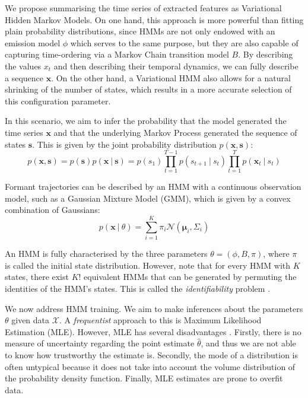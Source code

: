\documentclass[pdftex,11pt,a4paper]{article}
\theoremstyle{definition}
\theoremstyle{remark}
\newcommand*{\V}[1]{\mathbf{#1}}%
\newcommand\given[1][]{\:#1\vert\:}
\begin{document}
We propose summarising the time series of extracted features as Variational Hidden Markov Models. On one hand, this approach is more powerful than fitting plain probability distributions, since HMMs are not only endowed with an emission model $\phi$ which serves to the same purpose, but they are also capable of capturing time-ordering via a Markov Chain transition model $B$. By describing the values $x_t$ and then describing their temporal dynamics, we can fully describe a sequence $\V{x}$. On the other hand, a Variational HMM also allows for a natural shrinking of the number of states, which results in a more accurate selection of this configuration parameter.
\par In this scenario, we aim to infer the probability that the model generated the time series $\V{x}$ and that the underlying Markov Process generated the sequence of states $\V{s}$. This is given by the joint probability distribution $p(\V{x}, \V{s})$:
\begin{equation}\label{eq:hmm}
p(\V{x}, \V{s}) = p(\V{s})p(\V{x} \given \V{s}) = p(s_1)\prod_{t=1}^{T-1}p(s_{t+1}\given s_t)\prod_{t=1}^Tp(\V{x}_t \given s_t)
\end{equation} 
\par Formant trajectories can be described by an HMM with a continuous observation model, such as a Gaussian Mixture Model (GMM), which is given by a convex combination of Gaussians:
\begin{equation} \label{eq:mixmod}
p(\V{x} \given \theta ) = \sum_{i=1}^K\pi_i \mathcal{N}(\V{\mu}_i, \Sigma_i) 
\end{equation}
\par An HMM is fully characterised by the three parameters $\theta = (\phi, B, \pi)$, where $\pi$ is called the initial state distribution. However, note that for every HMM with $K$ states, there exist $K!$ equivalent HMMs that can be generated by permuting the identities of the HMM's states. This is called the \emph{identifiability} problem \cite{Bishop2006}.
\par We now address HMM training. We aim to make inferences about the parameters $\theta$ given data $\mathcal{X}$. A \emph{frequentist} approach to this is Maximum Likelihood Estimation (MLE). However, MLE has several disadvantages \cite{Murphy2012}. Firstly, there is no measure of uncertainty regarding the point estimate $\hat{\theta}$, and thus we are not able to know how trustworthy the estimate is. Secondly, the mode of a distribution is often untypical \cite{Murphy2012} because it does not take into account the volume distribution of the probability density function. Finally, MLE estimates are prone to overfit data. 
\end{document}
